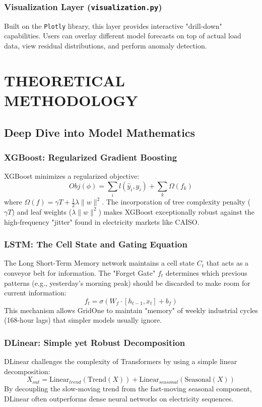 \documentclass[12pt,a4paper,twoside,fleqn]{report}
\begin{document}
\subsection{Visualization Layer (\texttt{visualization.py})}
Built on the \texttt{Plotly} library, this layer provides interactive "drill-down" capabilities. Users can overlay different model forecasts on top of actual load data, view residual distributions, and perform anomaly detection.

\chapter{THEORETICAL METHODOLOGY}
\section{Deep Dive into Model Mathematics}

\subsection{XGBoost: Regularized Gradient Boosting}
XGBoost minimizes a regularized objective:
\begin{equation}
    Obj(\phi) = \sum_i l(\hat{y}_i, y_i) + \sum_k \Omega(f_k)
\end{equation}
where $\Omega(f) = \gamma T + \frac{1}{2}\lambda \|w\|^2$. The incorporation of tree complexity penalty ($\gamma T$) and leaf weights ($\lambda \|w\|^2$) makes XGBoost exceptionally robust against the high-frequency "jitter" found in electricity markets like CAISO.

\subsection{LSTM: The Cell State and Gating Equation}
The Long Short-Term Memory network maintains a cell state $C_t$ that acts as a conveyor belt for information. The "Forget Gate" $f_t$ determines which previous patterns (e.g., yesterday's morning peak) should be discarded to make room for current information:
\begin{equation}
    f_t = \sigma(W_f \cdot [h_{t-1}, x_t] + b_f)
\end{equation}
This mechanism allows GridOne to maintain "memory" of weekly industrial cycles (168-hour lags) that simpler models usually ignore.

\subsection{DLinear: Simple yet Robust Decomposition}
DLinear challenges the complexity of Transformers by using a simple linear decomposition:
\begin{equation}
    X_{out} = \text{Linear}_{trend}(\text{Trend}(X)) + \text{Linear}_{seasonal}(\text{Seasonal}(X))
\end{equation}
By decoupling the slow-moving trend from the fast-moving seasonal component, DLinear often outperforms dense neural networks on electricity sequences.
\end{document}
